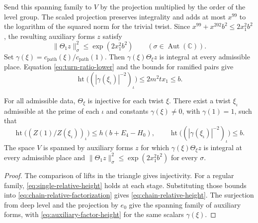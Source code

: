 Send this spanning family to \(V\) by the projection multiplied by
the order of the level group. The scaled projection preserves
integrality and adds at most \(x^{99}\) to the logarithm of the
squared norm for the trivial twist. Since
\(x^{99}+x^{202}b^2\le2x_1^2b^2\), the resulting auxiliary forms \(z\)
satisfy
\[
 \|\Theta_1 z\|_\sigma^2\le \exp(2x_1^2b^2)
 \qquad(\sigma\in\operatorname{Aut}(\mathbb C)).
\]
Set \(\gamma(\xi)=c_{\mathrm{path}}(\xi)/c_{\mathrm{path}}(1)\).
Then \(\gamma(\xi)\Theta_\xi z\) is integral at every admissible place.
Equation \eqref{eq:turn-ratio-lower} and the bounds for ramified pairs give
\begin{equation}
 \operatorname{ht}\bigl((|\gamma(\xi_\iota)|^{-2})_\iota\bigr)
 \le 2m^2t x_1\le b.
 \label{eq:auxiliary-factor-height}
\end{equation}

\begin{proposition}\label{prop:determinant-inputs}
For all admissible data, \(\Theta_\xi\) is injective for each twist \(\xi\).
There exist a twist \(\xi_\iota\) admissible at the prime of each \(\iota\)
and constants \(\gamma(\xi)\ne0\), with \(\gamma(1)=1\), such that
\[
 \operatorname{ht}\bigl((Z(1)/Z(\xi_\iota))_\iota\bigr)
       \le h(b+E_4-H_0),\qquad
 \operatorname{ht}\bigl((|\gamma(\xi_\iota)|^{-2})_\iota\bigr)\le b.
\]
The space \(V\) is spanned by auxiliary forms \(z\) for which
\(\gamma(\xi)\Theta_\xi z\) is integral at every admissible place and
\(\|\Theta_1 z\|_\sigma^2\le\exp(2x_1^2b^2)\) for every \(\sigma\).
\end{proposition}

\begin{proof}
The comparison of lifts in the triangle gives injectivity.
For a regular family, \eqref{eq:single-relative-height} holds at
each stage. Substituting those bounds into
\eqref{eq:chain-relative-factorization} gives
\eqref{eq:chain-relative-height}. The surjection from deep level and
the projection by \(e_0\) give the spanning family of auxiliary forms,
with \eqref{eq:auxiliary-factor-height} for the same scalars \(\gamma(\xi)\).
\end{proof}
